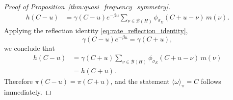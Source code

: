\documentclass[showpacs,amsmath,amssymb,twocolumn,prx,superscriptaddress,10pt,aps,nofootinbib]{revtex4-2}
\begin{document}
\begin{proof}[Proof of Proposition~\ref{thm:quasi_frequency_symmetry}]
\begin{align}
    h(C-u)
    &=
    \gamma(C-u)e^{-\beta u}
    \sum_{\nu\in\mathcal B(H)}
    \phi_{\sigma_E}(C+u-\nu)\,m(\nu).
\end{align}
Applying the reflection identity \eqref{eq:rate_reflection_identity},
\begin{equation}
\gamma(C-u)e^{-\beta u}=\gamma(C+u),
\end{equation}
we conclude that
\begin{align*}
h(C-u)&=\gamma(C+u)\sum_{\nu\in\mathcal B(H)}
\phi_{\sigma_E}(C+u-\nu)\,m(\nu)\\
&=h(C+u).
\end{align*}
Therefore \(\pi(C-u)=\pi(C+u)\), and the statement \(\langle \omega\rangle_\pi=C\) follows immediately.

\end{proof}
\end{document}

